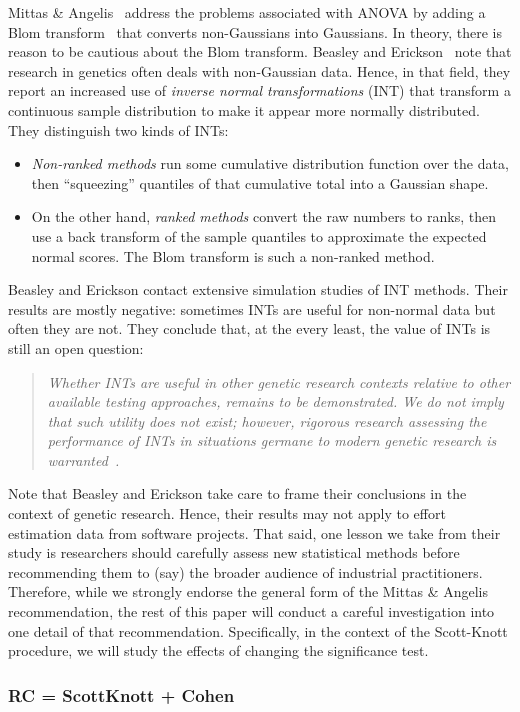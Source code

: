 \documentclass{sig-alternate}
\newcommand{\bi}{\begin{itemize}}
\newcommand{\ei}{\end{itemize}}
\begin{document}
Mittas \& Angelis~\cite{mittas12a} address the problems associated
with ANOVA by adding a Blom transform~\cite{blom58} that converts non-Gaussians
into Gaussians. In theory,
there is reason to be cautious about the Blom transform.
Beasley and Erickson~\cite{beasley09} note that research in genetics
often deals with non-Gaussian data. Hence, in that field, they report
an increased use of {\em inverse normal transformations} (INT) that
transform a continuous sample distribution to make it appear more
normally distributed.  They distinguish two kinds of INTs:
\bi
\item
{\em Non-ranked methods} run some cumulative distribution function
over the data, then ``squeezing'' quantiles of that cumulative total into a Gaussian shape.
\item
On the other hand,
{\em ranked methods} convert the raw numbers to ranks, then use a back transform of the sample
quantiles to approximate the expected normal scores.
The Blom transform is such a non-ranked method.
\ei
Beasley and Erickson contact extensive simulation studies of INT methods. 
Their results are mostly negative: sometimes INTs are useful for non-normal data but often
they are not. They conclude that, at the every least, the value of INTs is still an open question:
\begin{quote}
{\em Whether INTs are useful in other genetic research contexts
  relative to other available testing approaches, remains to be
  demonstrated. We do not imply that such utility does not exist;
  however, rigorous research assessing the performance of INTs in
  situations germane to modern genetic research is warranted~\cite{beasley09}.}
\end{quote}
Note that Beasley and Erickson take care to frame their conclusions in the context
of genetic research. Hence, their results may not apply to effort estimation data from software
projects. That said, one lesson we take from their study is  researchers should
carefully assess new statistical
methods before recommending them to (say) the broader audience of industrial practitioners. Therefore,
while we strongly endorse the general form of the Mittas \& Angelis recommendation, the rest of this
paper will conduct a careful investigation into one detail of that recommendation.
Specifically, in the context of the Scott-Knott procedure, we will study the effects of changing the
significance test.

\subsubsection{RC = ScottKnott + Cohen}
\end{document}
